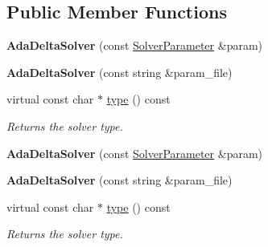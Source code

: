 \subsection*{Public Member Functions}
\begin{DoxyCompactItemize}
\item 
\mbox{\label{classcaffe_1_1_ada_delta_solver_ad6f176b0beaa4a41d111f2c10a35b2f5}} 
{\bfseries Ada\+Delta\+Solver} (const \mbox{\hyperlink{classcaffe_1_1_solver_parameter}{Solver\+Parameter}} \&param)
\item 
\mbox{\label{classcaffe_1_1_ada_delta_solver_adba552de0f9aa7e165cca5919d69cc09}} 
{\bfseries Ada\+Delta\+Solver} (const string \&param\+\_\+file)
\item 
\mbox{\label{classcaffe_1_1_ada_delta_solver_a645d215770c417a00f9d38482adb2ec0}} 
virtual const char $\ast$ \mbox{\hyperlink{classcaffe_1_1_ada_delta_solver_a645d215770c417a00f9d38482adb2ec0}{type}} () const
\begin{DoxyCompactList}\small\item\em Returns the solver type. \end{DoxyCompactList}\item 
\mbox{\label{classcaffe_1_1_ada_delta_solver_ad6f176b0beaa4a41d111f2c10a35b2f5}} 
{\bfseries Ada\+Delta\+Solver} (const \mbox{\hyperlink{classcaffe_1_1_solver_parameter}{Solver\+Parameter}} \&param)
\item 
\mbox{\label{classcaffe_1_1_ada_delta_solver_adba552de0f9aa7e165cca5919d69cc09}} 
{\bfseries Ada\+Delta\+Solver} (const string \&param\+\_\+file)
\item 
\mbox{\label{classcaffe_1_1_ada_delta_solver_a645d215770c417a00f9d38482adb2ec0}} 
virtual const char $\ast$ \mbox{\hyperlink{classcaffe_1_1_ada_delta_solver_a645d215770c417a00f9d38482adb2ec0}{type}} () const
\begin{DoxyCompactList}\small\item\em Returns the solver type. \end{DoxyCompactList}\end{DoxyCompactItemize}
